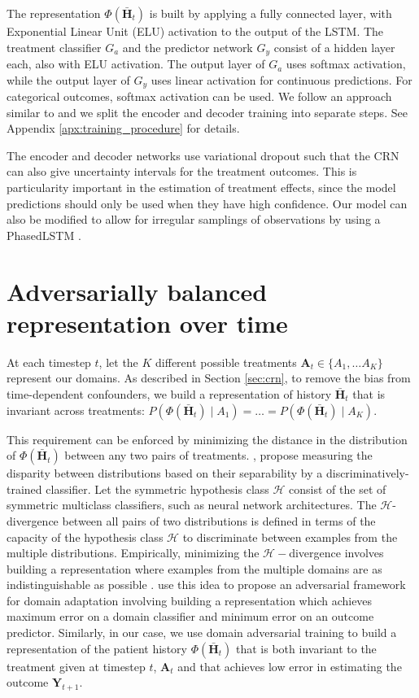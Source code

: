 \documentclass{article} %
\newcommand{\vc}[1]{\mathbf{#1}}
\newcommand{\cl}[1]{\mathcal{#1}}
\newcommand{\hist}[1]{\bar{\vc{#1}}}
\begin{document}
		
		The representation $\Phi(\hist{H}_t)$ is built by applying a fully connected layer, with Exponential Linear Unit (ELU)
		activation to the output of the LSTM. The treatment classifier $G_a$ and the predictor network $G_y$ consist of a hidden layer each, also with ELU activation. The output layer of $G_a$ uses softmax activation, while the output layer of $G_y$ uses linear activation for continuous predictions. For categorical outcomes, softmax activation can be used. We follow an approach similar to \citet{lim2018forecasting} and we split the encoder and decoder training into separate steps. See Appendix \ref{apx:training_procedure} for details.  	  
		
		The encoder and decoder networks use variational dropout \citep{gal2016theoretically} such that the CRN can also give uncertainty intervals for the treatment outcomes. This is particularity important in the estimation of treatment effects, since the model predictions should only be used when they have high confidence.  Our model can also be modified to allow for irregular samplings of observations by using a PhasedLSTM \citep{neil2016phased}. 

	
	\section{Adversarially balanced representation over time} \label{sec:adv_bal_rep}

	At each timestep $t$, let the $K$ different possible treatments $\vc{A}_t \in \{ A_{1}, \dots A_{K} \}$ represent our domains. As described in Section \ref{sec:crn}, to remove the bias from time-dependent confounders, we build a representation of history $\hist{H}_t$ that is invariant across treatments: $P( \Phi(\hist{H}_t)\mid A_{1}) = \dots = P( \Phi(\hist{H}_t)\mid A_{K})$.



	This requirement can be enforced by minimizing the distance in the distribution of $\Phi(\hist{H}_t)$ between any two pairs of treatments. \citet{kifer2004detecting, ben2007analysis}, propose measuring the disparity between distributions based on their separability by a  discriminatively-trained classifier. Let the symmetric hypothesis class $\cl{H}$ consist of the set of symmetric multiclass classifiers, such as neural network architectures. 
	The $\cl{H}$-divergence between all pairs of two distributions is defined in terms of the capacity of the hypothesis class $\cl{H}$ to discriminate between examples from the multiple distributions. Empirically, minimizing the $\cl{H}-$divergence involves building a representation where examples from the multiple domains are as indistinguishable as possible \citep{ben2007analysis, li2018deep, sebag2019multi}. \cite{ganin2016domain} use this idea to propose an adversarial framework for domain adaptation involving building a representation which achieves maximum error on a domain classifier and minimum error on an outcome predictor. Similarly, in our case, we use domain adversarial training  to build a representation of the patient history $\Phi(\hist{H}_t)$ that is both invariant to the treatment given at timestep $t$, $\vc{A}_t$ and that achieves low error in estimating the outcome $\vc{Y}_{t+1}$. 
\end{document}
